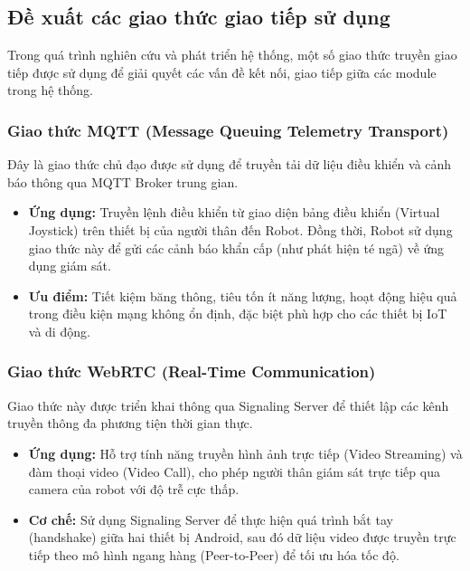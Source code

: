 
\subsection{Đề xuất các giao thức giao tiếp sử dụng}

Trong quá trình nghiên cứu và phát triển hệ thống, một số giao thức truyền giao tiếp được sử dụng để giải quyết các vấn đề kết nối, giao tiếp giữa các module trong hệ thống.

\subsubsection{Giao thức MQTT (Message Queuing Telemetry Transport)}
Đây là giao thức chủ đạo được sử dụng để truyền tải dữ liệu điều khiển và cảnh báo thông qua MQTT Broker trung gian.
\begin{itemize}
    \item \textbf{Ứng dụng:} Truyền lệnh điều khiển từ giao diện bảng điều khiển (Virtual Joystick) trên thiết bị của người thân đến Robot. Đồng thời, Robot sử dụng giao thức này để gửi các cảnh báo khẩn cấp (như phát hiện té ngã) về ứng dụng giám sát.
    \item \textbf{Ưu điểm:} Tiết kiệm băng thông, tiêu tốn ít năng lượng, hoạt động hiệu quả trong điều kiện mạng không ổn định, đặc biệt phù hợp cho các thiết bị IoT và di động.
\end{itemize}

\subsubsection{Giao thức WebRTC (Real-Time Communication)}
Giao thức này được triển khai thông qua Signaling Server để thiết lập các kênh truyền thông đa phương tiện thời gian thực.
\begin{itemize}
    \item \textbf{Ứng dụng:} Hỗ trợ tính năng truyền hình ảnh trực tiếp (Video Streaming) và đàm thoại video (Video Call), cho phép người thân giám sát trực tiếp qua camera của robot với độ trễ cực thấp.
    \item \textbf{Cơ chế:} Sử dụng Signaling Server để thực hiện quá trình bắt tay (handshake) giữa hai thiết bị Android, sau đó dữ liệu video được truyền trực tiếp theo mô hình ngang hàng (Peer-to-Peer) để tối ưu hóa tốc độ.
\end{itemize}

